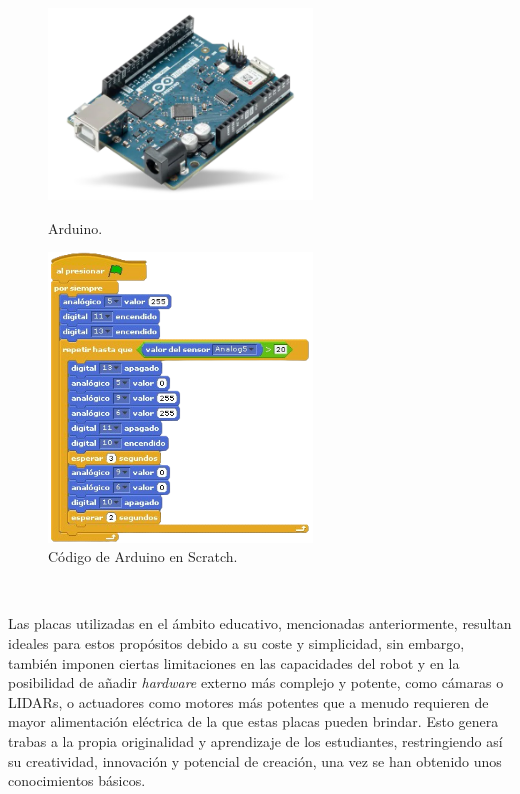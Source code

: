 \begin{figure}[h!]
  \centering
  \begin{minipage}{0.45\textwidth}
    \centering
    \includegraphics[width=7cm]{figs/arduino}
    \caption{Arduino.}
    \label{fig:arduino}
  \end{minipage}
  \hfill
  \begin{minipage}{0.45\textwidth}
    \centering
    \includegraphics[width=7cm]{figs/scratch_arduino_code}
    \caption{Código de Arduino en Scratch.}
    \label{fig:scratch}
  \end{minipage}
\end{figure}\

Las placas utilizadas en el ámbito educativo, mencionadas anteriormente,
resultan ideales para estos propósitos debido a su coste y simplicidad, sin
embargo, también imponen ciertas limitaciones en las capacidades del robot y en
la posibilidad de añadir \textit{hardware} externo más complejo y potente, como
cámaras o LIDARs, o actuadores como motores más potentes que a menudo requieren
de mayor alimentación eléctrica de la que estas placas pueden brindar.
Esto genera trabas a la propia originalidad y aprendizaje de los estudiantes,
restringiendo así su creatividad, innovación y potencial de creación, una vez se
han obtenido unos conocimientos básicos.

